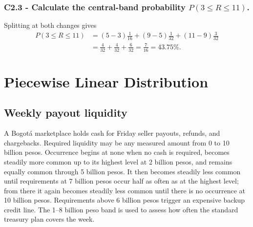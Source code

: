 \subsubsection*{C2.3 - Calculate the central-band probability
$P(3\le R\le11)$.}
\label{subsec:c2-piecewise-uniform-refund-c}
Splitting at both changes gives
\[
 \begin{aligned}
 P(3\le R\le11)
 &=(5-3)\frac1{16}+(9-5)\frac1{32}+(11-9)\frac3{32}\\
 &=\frac4{32}+\frac4{32}+\frac6{32}=\frac7{16}=43.75\%.
 \end{aligned}
\]

\section{Piecewise Linear Distribution}\label{sec:c2-piecewise-linear-practice}

\subsection{Weekly payout liquidity}\label{sec:c2-piecewise-linear-liquidity}
A Bogotá marketplace holds cash for Friday seller payouts, refunds, and
chargebacks.  Required liquidity may be any measured amount from 0 to 10
billion pesos.  Occurrence begins at none when no cash is required,
becomes steadily more common up to its highest level at 2 billion pesos, and
remains equally common through 5 billion pesos.  It then becomes steadily less
common until requirements at 7 billion pesos occur half as often as at the
highest level; from there it again becomes steadily less common until there is
no occurrence at 10 billion pesos.  Requirements above 6 billion
pesos trigger an expensive backup credit line.  The 1--8 billion peso band is
used to assess how often the standard treasury plan covers the week.

\begingroup{}
\endgroup

